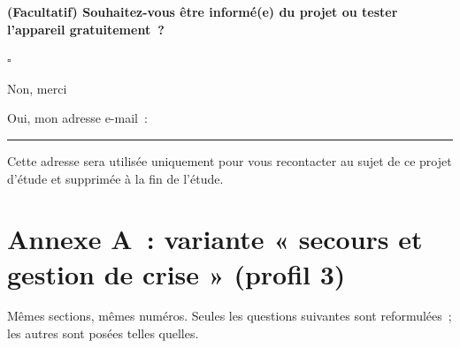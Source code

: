 \documentclass[11pt,a4paper]{article}
\newcommand{\quest}[2]{\par\Needspace{6\baselineskip}\vspace{4pt}\noindent{\sffamily\bfseries\color{insarouge}Q#1}\hspace{0.5em}\textbf{#2}\par\nopagebreak}
\newenvironment{choix}
  {\begin{list}{$\square$}{\setlength{\itemsep}{0pt}\setlength{\topsep}{2pt}\setlength{\parsep}{0pt}%
    \setlength{\leftmargin}{1.7em}\setlength{\labelwidth}{1.2em}\setlength{\labelsep}{0.5em}}}
  {\end{list}}
\begin{document}
\quest{23}{(Facultatif) Souhaitez-vous être informé(e) du projet ou tester l'appareil gratuitement~?}
\begin{choix}
  \item Non, merci
  \item Oui, mon adresse e-mail~: \rule{6cm}{0.3pt}
\end{choix}
{\small Cette adresse sera utilisée uniquement pour vous recontacter au sujet de ce projet d'étude et supprimée à la fin de l'étude.}

\vspace{4pt}
\begin{center}
\end{center}

\newpage
\section*{Annexe A~: variante « secours et gestion de crise » (profil 3)}

Mêmes sections, mêmes numéros. Seules les questions suivantes sont reformulées~; les autres sont posées telles quelles.
\end{document}
